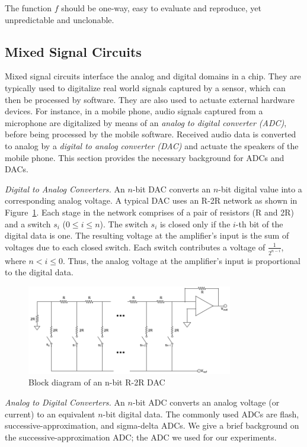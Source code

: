 The function $f$ should be one-way, easy to evaluate and reproduce, yet unpredictable
and unclonable. 

\subsection{Mixed Signal Circuits}
Mixed signal circuits interface the analog and digital domains in a chip. 
They are typically used to digitalize real world signals captured by
a sensor, which
can then be processed by software. They are also used to actuate external 
hardware devices. 
For instance, in a mobile phone, audio signals captured from 
a microphone are digitalized by means of an {\em analog to digital converter
(ADC)}, before being processed by the mobile software. Received audio data is
converted to analog by a {\em digital to analog converter (DAC)} and actuate the
speakers of the mobile phone. This section provides the necessary background
for ADCs and DACs.

{\flushleft \em Digital to Analog Converters.}
An $n$-bit DAC converts an $n$-bit digital value into a corresponding analog
voltage. A typical DAC uses an R-2R network as shown in Figure~\ref{fig:r2r}.
Each stage in the network comprises of a pair of 
resistors (R and 2R) and a switch $s_i$ 
($0 \le i \le n$). The switch $s_i$ is closed only if the $i$-th bit of the
digital data is one. The resulting voltage at the amplifier's input is the
sum of voltages due to each closed switch. 
Each switch contributes a voltage of $\frac{1}{2^{n-i}}$, 
where $n < i \le 0$. 
Thus, the analog voltage at the amplifier's input
is proportional to the digital data.

\begin{figure}
\includegraphics[width=9cm]{R-2R-DAC.png}
\centering
\caption{Block diagram of an n-bit R-2R DAC\label{fig:r2r}}
\end{figure}

{\flushleft \em Analog to Digital Converters.}
An $n$-bit ADC converts an analog voltage (or current) to 
an equivalent $n$-bit digital data. The commonly used ADCs are
flash, successive-approximation, and sigma-delta ADCs. We give
a brief background on the successive-approximation ADC; the 
ADC we used for our experiments.

